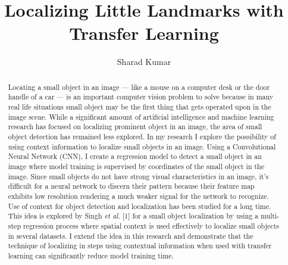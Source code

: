 \documentclass [11pt,letterpaper ,twoside ,openany ]{report}
\title{Localizing Little Landmarks with Transfer Learning}
\author{Sharad Kumar}
\begin{document}
  \maketitle
  \tableofcontents

    \begin{abstract}
    Locating a small object in an image --- like a mouse on a computer desk or the door handle of a car --- is an important computer vision problem to solve because in many real life situations small object may be the first thing that gets operated upon in the image scene. While a significant amount of artificial intelligence and machine learning research has focused on localizing prominent object in an image, the area of small object detection has remained less explored. In my research I explore the possibility of using context information to localize small objects in an image. Using a Convolutional Neural Network (CNN), I create a regression model to detect a small object in an image where model training is supervised by coordinates of the small object in the image. Since small objects do not have strong visual characteristics in an image, it's difficult for a neural network to discern their pattern because their feature map exhibits low resolution rendering a much weaker signal for the network to recognize. Use of context for object detection and localization has been studied for a long time. This idea is explored by Singh \textit{et al.} [1] for a small object localization by using a multi-step regression process where  spatial context is used effectively to localize small objects in several datasets. I extend the idea in this research and demonstrate that the technique of localizing in steps using contextual information when used with transfer learning can significantly reduce model training time.
    \end{abstract}    

    \listoffigures
\end{document}
